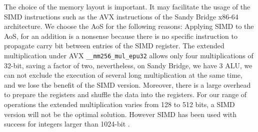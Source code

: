 \documentclass[oribibl]{llncs2e/llncs}
\begin{document}

The choice of the memory layout is important. It may facilitate  the usage of the SIMD instructions such as the AVX instructions of the Sandy Bridge x86-64 architecture. We choose the AoS for the following reasons:
Applying SIMD to the AoS, for an addition is a nonsense because there is no specific instruction to propagate carry bit between entries of the SIMD register.
The extended multiplication under AVX \texttt{\_\_mm256\_mul\_epu32}  allows only four multiplications of 32-bit, saving a factor of two, nevertheless, on Sandy Bridge, we have 3 ALU, we can not exclude
the execution of several long multiplication at the same time, and we lose the benefit of the SIMD version. Moreover, there is a large overhead  to prepare the registers and shuffle the data into the registers. For our range of operations the extended multiplication varies from 128 to 512 bits, a SIMD version will not be the optimal solution. However SIMD has been used with success for  integers larger  than 1024-bit \cite{SIMD}.
\end{document}
